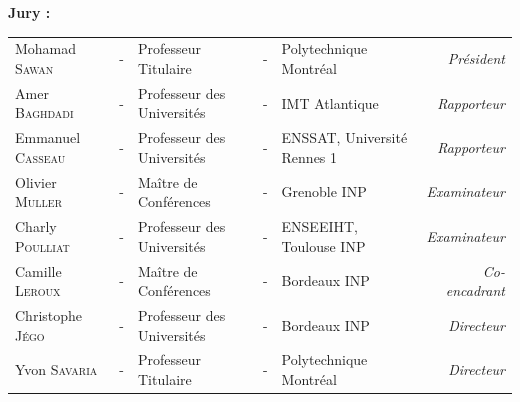 \documentclass[a4paper, 11pt]{article}
\begin{document}
          \noindent \large \textbf{Jury :} \\
          \vspace*{-1.5em}
          \begin{center}
            \begin{tabular}{lclclr}
              Mohamad \textsc{Sawan}     & - & Professeur Titulaire       & - & Polytechnique Montréal      & \textit{Président}    \\
              Amer \textsc{Baghdadi}     & - & Professeur des Universités & - & IMT Atlantique              & \textit{Rapporteur}   \\
              Emmanuel \textsc{Casseau}  & - & Professeur des Universités & - & ENSSAT, Université Rennes 1 & \textit{Rapporteur}   \\
              Olivier \textsc{Muller}    & - & Maître de Conférences      & - & Grenoble INP                & \textit{Examinateur}    \\
              Charly \textsc{Poulliat}   & - & Professeur des Universités & - & ENSEEIHT, Toulouse INP      & \textit{Examinateur}    \\
              Camille \textsc{Leroux}    & - & Maître de Conférences      & - & Bordeaux INP                & \textit{Co-encadrant} \\
              Christophe \textsc{Jégo}   & - & Professeur des Universités & - & Bordeaux INP                & \textit{Directeur}    \\
              Yvon \textsc{Savaria}      & - & Professeur Titulaire       & - & Polytechnique Montréal      & \textit{Directeur}    \\
            \end{tabular}
          \end{center}
          
          
          
        
\end{document}
